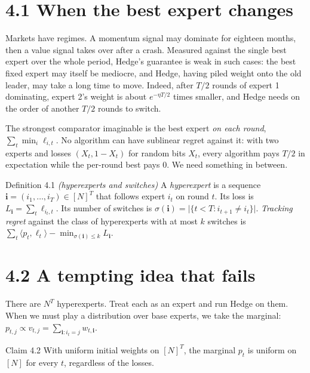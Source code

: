 \documentclass[11pt,a4paper,openany]{book}
\newcommand{\ip}[2]{\langle #1,#2\rangle}
\newcommand{\abs}[1]{\lvert #1\rvert}
\begin{document}
\section*{4.1 When the best expert changes}\label{ch4-motivation}

Markets have regimes. A momentum signal may dominate for eighteen months, then a value signal takes over after a crash. Measured against the single best expert over the whole period, Hedge's guarantee is weak in such cases: the best fixed expert may itself be mediocre, and Hedge, having piled weight onto the old leader, may take a long time to move. Indeed, after $T/2$ rounds of expert 1 dominating, expert 2's weight is about $e^{-\eta T/2}$ times smaller, and Hedge needs on the order of another $T/2$ rounds to switch.

The strongest comparator imaginable is the best expert \emph{on each round}, $\sum_t\min_i\ell_{i,t}$. No algorithm can have sublinear regret against it: with two experts and losses $(X_t,1-X_t)$ for random bits $X_t$, every algorithm pays $T/2$ in expectation while the per-round best pays $0$. We need something in between.

\begin{bdef}{Definition 4.1 \emph{(hyperexperts and switches)}}
A \emph{hyperexpert} is a sequence $\mathbf i=(i_1,\dots,i_T)\in[N]^T$ that follows expert $i_t$ on round $t$. Its loss is $L_{\mathbf i}=\sum_t\ell_{i_t,t}$. Its number of switches is $\sigma(\mathbf i)=\abs{\{t<T:i_{t+1}\neq i_t\}}$. \emph{Tracking regret} against the class of hyperexperts with at most $k$ switches is $\sum_t\ip{p_t}{\ell_t}-\min_{\sigma(\mathbf i)\le k}L_{\mathbf i}$.
\end{bdef}

\section*{4.2 A tempting idea that fails}\label{ch4-uniform}

There are $N^T$ hyperexperts. Treat each as an expert and run Hedge on them. When we must play a distribution over base experts, we take the marginal: $p_{t,j}\propto v_{t,j}=\sum_{\mathbf i:i_t=j}w_{t,\mathbf i}$.

\begin{bthm}{Claim 4.2}
With uniform initial weights on $[N]^T$, the marginal $p_t$ is uniform on $[N]$ for every $t$, regardless of the losses.
\end{bthm}
\end{document}
